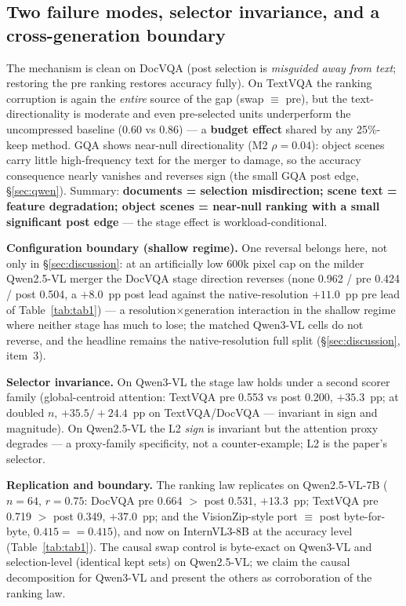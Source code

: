 \documentclass[sigconf,review,anonymous]{acmart}
\begin{document}
\subsection{Two failure modes, selector invariance, and a cross-generation boundary}\label{sec:modes}

The mechanism is clean on DocVQA (post selection is \emph{misguided away from
text}; restoring the pre ranking restores accuracy fully). On TextVQA the
ranking corruption is again the \emph{entire} source of the gap (swap $\equiv$
pre), but the text-directionality is moderate and even pre-selected units
underperform the uncompressed baseline (0.60 vs 0.86) --- a \textbf{budget
effect} shared by any 25\%-keep method. GQA shows near-null directionality (M2
$\rho = 0.04$): object scenes carry little high-frequency text for the merger to
damage, so the accuracy consequence nearly vanishes and reverses sign (the small
GQA post edge, \S\ref{sec:qwen}). Summary: \textbf{documents = selection
misdirection; scene text = feature degradation; object scenes = near-null
ranking with a small significant post edge} --- the stage effect is
workload-conditional.

\textbf{Configuration boundary (shallow regime).} One reversal belongs here, not
only in \S\ref{sec:discussion}: at an artificially low 600k pixel cap on the
milder Qwen2.5-VL merger the DocVQA stage direction reverses (none 0.962 / pre
0.424 / post 0.504, a $+8.0$~pp post lead against the native-resolution
$+11.0$~pp pre lead of Table~\ref{tab:tab1}) --- a resolution$\times$generation
interaction in the shallow regime where neither stage has much to lose; the
matched Qwen3-VL cells do not reverse, and the headline remains the
native-resolution full split (\S\ref{sec:discussion}, item~3).

\textbf{Selector invariance.} On Qwen3-VL the stage law holds under a second
scorer family (global-centroid attention: TextVQA pre 0.553 vs post 0.200,
$+35.3$~pp; at doubled $n$, $+35.5 / +24.4$~pp on TextVQA/DocVQA --- invariant
in sign and magnitude). On Qwen2.5-VL the L2 \emph{sign} is invariant but the
attention proxy degrades --- a proxy-family specificity, not a counter-example;
L2 is the paper's selector.

\textbf{Replication and boundary.} The ranking law replicates on
Qwen2.5-VL-7B ($n = 64$, $r = 0.75$: DocVQA pre 0.664 $>$ post 0.531,
$+13.3$~pp; TextVQA pre 0.719 $>$ post 0.349, $+37.0$~pp; and the VisionZip-style
port $\equiv$ post byte-for-byte, $0.415 == 0.415$), and now on InternVL3-8B at
the accuracy level (Table~\ref{tab:tab1}). The causal swap control is byte-exact
on Qwen3-VL and selection-level (identical kept sets) on Qwen2.5-VL; we claim
the causal decomposition for Qwen3-VL and present the others as corroboration of
the ranking law.
\end{document}
